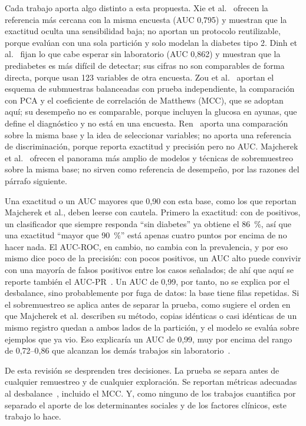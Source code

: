 \documentclass[journal]{IEEEtran}
\begin{document}
Cada trabajo aporta algo distinto a esta propuesta. Xie et al.~\cite{xie2019} ofrecen la referencia más cercana con la misma encuesta (AUC 0,795) y muestran que la exactitud oculta una sensibilidad baja; no aportan un protocolo reutilizable, porque evalúan con una sola partición y solo modelan la diabetes tipo 2. Dinh et al.~\cite{dinh2019} fijan lo que cabe esperar sin laboratorio (AUC 0,862) y muestran que la prediabetes es más difícil de detectar; sus cifras no son comparables de forma directa, porque usan 123 variables de otra encuesta. Zou et al.~\cite{zou2018} aportan el esquema de submuestras balanceadas con prueba independiente, la comparación con PCA y el coeficiente de correlación de Matthews (MCC), que se adoptan aquí; su desempeño no es comparable, porque incluyen la glucosa en ayunas, que define el diagnóstico y no está en una encuesta. Ren~\cite{ren2024} aporta una comparación sobre la misma base y la idea de seleccionar variables; no aporta una referencia de discriminación, porque reporta exactitud y precisión pero no AUC. Majcherek et al.~\cite{majcherek2025} ofrecen el panorama más amplio de modelos y técnicas de sobremuestreo sobre la misma base; no sirven como referencia de desempeño, por las razones del párrafo siguiente.

Una exactitud o un AUC mayores que 0,90 con esta base, como los que reportan Majcherek et al., deben leerse con cautela. Primero la exactitud: con \prevalencia{} de positivos, un clasificador que siempre responda ``sin diabetes'' ya obtiene el 86~\%, así que una exactitud ``mayor que 90~\%'' está apenas cuatro puntos por encima de no hacer nada. El AUC-ROC, en cambio, no cambia con la prevalencia, y por eso mismo dice poco de la precisión: con pocos positivos, un AUC alto puede convivir con una mayoría de falsos positivos entre los casos señalados; de ahí que aquí se reporte también el AUC-PR~\cite{saito2015}. Un AUC de 0,99, por tanto, no se explica por el desbalance, sino probablemente por fuga de datos: la base tiene \nDuplicados{} filas repetidas. Si el sobremuestreo se aplica antes de separar la prueba, como sugiere el orden en que Majcherek et al. describen su método, copias idénticas o casi idénticas de un mismo registro quedan a ambos lados de la partición, y el modelo se evalúa sobre ejemplos que ya vio. Eso explicaría un AUC de 0,99, muy por encima del rango de 0,72--0,86 que alcanzan los demás trabajos sin laboratorio~\cite{xie2019,dinh2019}.

De esta revisión se desprenden tres decisiones. La prueba se separa antes de cualquier remuestreo y de cualquier exploración. Se reportan métricas adecuadas al desbalance~\cite{he2009,saito2015}, incluido el MCC. Y, como ninguno de los trabajos cuantifica por separado el aporte de los determinantes sociales y de los factores clínicos, este trabajo lo hace.
\end{document}
